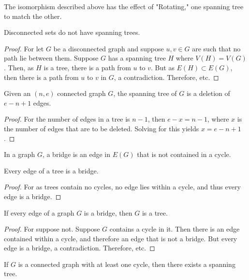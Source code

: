         \begin{remark}
        The isomorphism described above has the effect of "Rotating," one spanning tree to match the other.
        \end{remark}
        \begin{theorem}
        Disconnected sets do not have spanning trees.
        \end{theorem}
        \begin{proof}
        For let $G$ be a disconnected graph and suppose $u,v\in G$ are such that no path lie between them. Suppose $G$ has a spanning tree $H$ where $V(H)=V(G)$. Then, as $H$ is a tree, there is a path from $u$ to $v$. But as $E(H)\subset E(G)$, then there is a path from $u$ to $v$ in $G$, a contradiction. Therefore, etc.
        \end{proof}
        \begin{theorem}
        Given an $(n,e)$ connected graph $G$, the spanning tree of $G$ is a deletion of $e-n+1$ edges.
        \end{theorem}
        \begin{proof}
        For the number of edges in a tree is $n-1$, then $e-x = n-1$, where $x$ is the number of edges that are to be deleted. Solving for this yields $x=e-n+1$.
        \end{proof}
        \begin{definition}
        In a graph $G$, a bridge is an edge in $E(G)$ that is not contained in a cycle.
        \end{definition}
        \begin{corollary}
        Every edge of a tree is a bridge.
        \end{corollary}
        \begin{proof}
        For as trees contain no cycles, no edge lies within a cycle, and thus every edge is a bridge.
        \end{proof}
        \begin{corollary}
        If every edge of a graph $G$ is a bridge, then $G$ is a tree.
        \end{corollary}
        \begin{proof}
        For suppose not. Suppose $G$ contains a cycle in it. Then there is an edge contained within a cycle, and therefore an edge that is not a bridge. But every edge is a bridge, a contradiction. Therefore, etc.
        \end{proof}
        \begin{theorem}
        If $G$ is a connected graph with at least one cycle, then there exists a spanning tree.
        \end{theorem}
